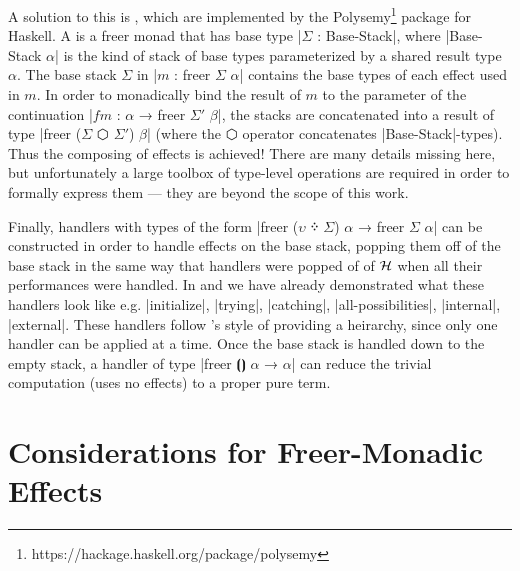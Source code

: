 A solution to this is , which are implemented by the Polysemy\footnote{https://hackage.haskell.org/package/polysemy} package for Haskell.
A  is a freer monad that has base type \code|$Σ$ : Base-Stack|,
where \code|Base-Stack $α$| is the kind of stack of base types parameterized by a shared result type $α$.
The base stack $Σ$ in \code|$m$ : freer $Σ$ $α$| contains the base types of each effect used in $m$.
In order to monadically bind the result of $m$ to the parameter of the continuation \code|$fm$ : $α$ → freer $Σ'$ $β$|, the stacks are concatenated into a result of type \code|freer ($Σ$ $⬡$ $Σ'$) $β$| (where the $⬡$ operator concatenates \code|Base-Stack|-types).
Thus the composing of effects is achieved!
There are many details missing here, but unfortunately a large toolbox of type-level operations are required in order to formally express them --- they are beyond the scope of this work.

Finally, handlers with types of the form \code|freer ($υ$ ᠅ $Σ$) $α$ → freer $Σ$ $α$| can be constructed in order to handle effects on the base stack, popping them off of the base stack in the same way that handlers were popped of of $\mathcal{H}$ when all their performances were handled.
In \LangC and \LangE we have already demonstrated what these handlers look like e.g. \code|initialize|, \code|trying|, \code|catching|, \code|all-possibilities|, \code|internal|, \code|external|.
These handlers follow \LangD's style of providing a heirarchy, since only one handler can be applied at a time.
Once the base stack is handled down to the empty stack, a handler of type \code|freer $⦗⦘$ $α$ → $α$| can reduce the trivial computation (uses no effects) to a proper pure term.

\section{Considerations for Freer-Monadic Effects}

